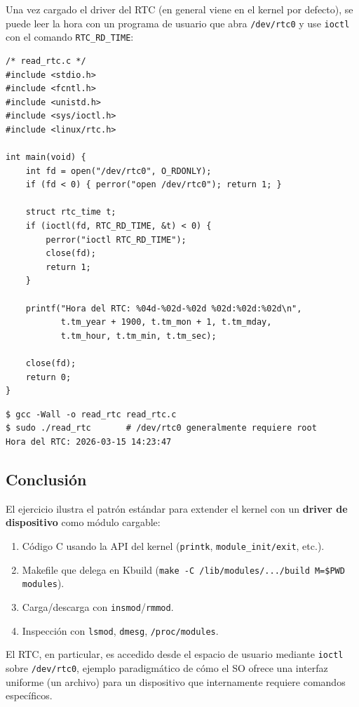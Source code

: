 \documentclass[11pt,a4paper]{article}
\begin{document}
Una vez cargado el driver del RTC (en general viene en el kernel por
defecto), se puede leer la hora con un programa de usuario que abra
\texttt{/dev/rtc0} y use \texttt{ioctl} con el comando
\texttt{RTC\_RD\_TIME}:

\begin{lstlisting}[style=cstyle]
/* read_rtc.c */
#include <stdio.h>
#include <fcntl.h>
#include <unistd.h>
#include <sys/ioctl.h>
#include <linux/rtc.h>

int main(void) {
    int fd = open("/dev/rtc0", O_RDONLY);
    if (fd < 0) { perror("open /dev/rtc0"); return 1; }

    struct rtc_time t;
    if (ioctl(fd, RTC_RD_TIME, &t) < 0) {
        perror("ioctl RTC_RD_TIME");
        close(fd);
        return 1;
    }

    printf("Hora del RTC: %04d-%02d-%02d %02d:%02d:%02d\n",
           t.tm_year + 1900, t.tm_mon + 1, t.tm_mday,
           t.tm_hour, t.tm_min, t.tm_sec);

    close(fd);
    return 0;
}
\end{lstlisting}

\begin{lstlisting}[style=shellstyle]
$ gcc -Wall -o read_rtc read_rtc.c
$ sudo ./read_rtc       # /dev/rtc0 generalmente requiere root
Hora del RTC: 2026-03-15 14:23:47
\end{lstlisting}

\subsection*{Conclusión}

El ejercicio ilustra el patrón estándar para extender el kernel con un
\textbf{driver de dispositivo} como módulo cargable:

\begin{enumerate}[leftmargin=*,nosep]
    \item Código C usando la API del kernel (\texttt{printk},
        \texttt{module\_init/exit}, etc.).
    \item Makefile que delega en Kbuild
        (\texttt{make -C /lib/modules/.../build M=\$PWD modules}).
    \item Carga/descarga con \texttt{insmod}/\texttt{rmmod}.
    \item Inspección con \texttt{lsmod}, \texttt{dmesg},
        \texttt{/proc/modules}.
\end{enumerate}

El RTC, en particular, es accedido desde el espacio de usuario
mediante \texttt{ioctl} sobre \texttt{/dev/rtc0}, ejemplo paradigmático
de cómo el SO ofrece una interfaz uniforme (un archivo) para un
dispositivo que internamente requiere comandos específicos.
\end{document}

